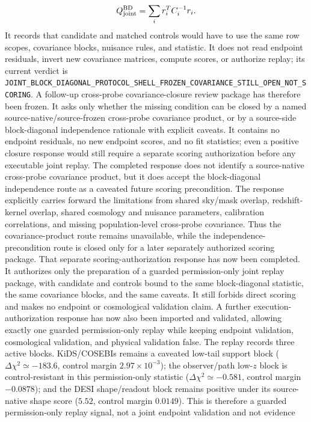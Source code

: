\[
  Q_{\rm joint}^{\rm BD}=\sum_i r_i^T C_i^{-1} r_i .
\]
It records that candidate and matched controls would have to use the same row
scopes, covariance blocks, nuisance rules, and statistic.  It does not read
endpoint residuals, invert new covariance matrices, compute scores, or
authorize replay; its current verdict is
\texttt{JOINT\_BLOCK\_DIAGONAL\_PROTOCOL\_SHELL\_FROZEN\_COVARIANCE\_STILL\_OPEN\_NOT\_SCORING}.
A follow-up cross-probe covariance-closure review package has therefore been
frozen.  It asks only whether the missing condition can be closed by a named
source-native/source-frozen cross-probe covariance product, or by a source-side
block-diagonal independence rationale with explicit caveats.  It contains no
endpoint residuals, no new endpoint scores, and no fit statistics; even a
positive closure response would still require a separate scoring authorization
before any executable joint replay.
The completed response does not identify a source-native cross-probe covariance
product, but it does accept the block-diagonal independence route as a caveated
future scoring precondition.  The response explicitly carries forward the
limitations from shared sky/mask overlap, redshift-kernel overlap, shared
cosmology and nuisance parameters, calibration correlations, and missing
population-level cross-probe covariance.  Thus the covariance-product route
remains unavailable, while the independence-precondition route is closed only
for a later separately authorized scoring package.  That separate
scoring-authorization response has now been completed.  It authorizes only the
preparation of a guarded permission-only joint replay package, with candidate
and controls bound to the same block-diagonal statistic, the same covariance
blocks, and the same caveats.  It still forbids direct scoring and makes no
endpoint or cosmological validation claim.  A further execution-authorization
response has now also been imported and validated, allowing exactly one guarded
permission-only replay while keeping endpoint validation, cosmological
validation, and physical validation false.  The replay records three active
blocks.  KiDS/COSEBIs remains a caveated low-tail support block
(\(\Delta\chi^2\simeq-183.6\), control margin \(2.97\times10^{-3}\)); the
observer/path low-\(z\) block is control-resistant in this permission-only
statistic (\(\Delta\chi^2\simeq-0.581\), control margin \(-0.0878\)); and the
DESI shape/readout block remains positive under its source-native shape score
(\(5.52\), control margin \(0.0149\)).  This is therefore a guarded
permission-only replay signal, not a joint endpoint validation and not evidence
